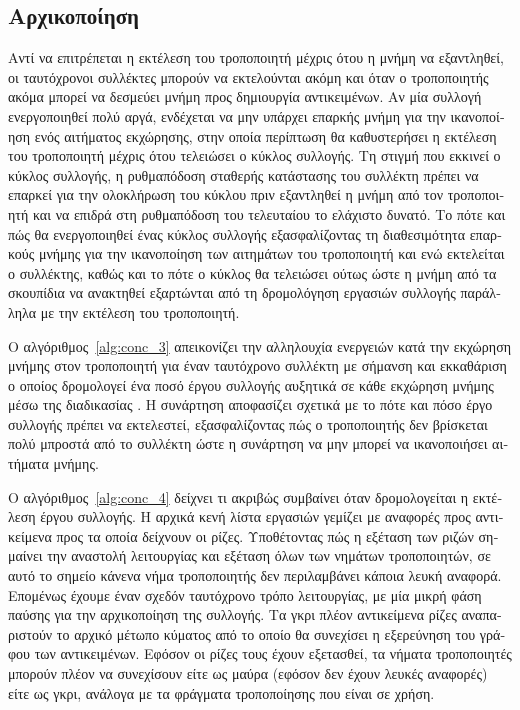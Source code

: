 \begin{greek}
\subsection{Αρχικοποίηση}
Αντί να επιτρέπεται η εκτέλεση του τροποποιητή μέχρις ότου η μνήμη να εξαντληθεί, οι ταυτόχρονοι 
συλλέκτες μπορούν να εκτελούνται ακόμη και όταν ο τροποποιητής ακόμα μπορεί να δεσμεύει μνήμη 
προς δημιουργία αντικειμένων. Αν μία συλλογή  ενεργοποιηθεί πολύ αργά, ενδέχεται να μην υπάρχει 
επαρκής μνήμη για την ικανοποίηση ενός αιτήματος εκχώρησης, στην οποία περίπτωση θα καθυστερήσει 
η εκτέλεση του τροποποιητή μέχρις ότου τελειώσει ο κύκλος συλλογής. Τη στιγμή που εκκινεί ο 
κύκλος συλλογής, η ρυθμαπόδοση σταθερής κατάστασης του συλλέκτη πρέπει να επαρκεί για την 
ολοκλήρωση του κύκλου πριν εξαντληθεί η μνήμη από τον τροποποιητή και να επιδρά στη ρυθμαπόδοση 
του τελευταίου το ελάχιστο δυνατό. Το πότε και πώς θα ενεργοποιηθεί ένας κύκλος συλλογής 
εξασφαλίζοντας τη διαθεσιμότητα επαρκούς μνήμης για την ικανοποίηση των αιτημάτων του τροποποιητή 
και ενώ εκτελείται ο συλλέκτης, καθώς και το πότε ο κύκλος θα τελειώσει ούτως ώστε η μνήμη από
τα σκουπίδια να ανακτηθεί εξαρτώνται από τη δρομολόγηση εργασιών συλλογής παράλληλα με την 
εκτέλεση του τροποποιητή.

Ο αλγόριθμος~\ref{alg:conc_3} απεικονίζει την αλληλουχία ενεργειών κατά την εκχώρηση μνήμης στον 
τροποποιητή για έναν ταυτόχρονο συλλέκτη με σήμανση και εκκαθάριση ο οποίος δρομολογεί ένα 
ποσό έργου συλλογής αυξητικά σε κάθε εκχώρηση μνήμης μέσω της διαδικασίας \textenglish{}. 
Η συνάρτηση \textenglish{} αποφασίζει σχετικά με το πότε και πόσο έργο συλλογής πρέπει να 
εκτελεστεί, εξασφαλίζοντας πώς ο τροποποιητής δεν βρίσκεται πολύ μπροστά από το συλλέκτη ώστε η 
συνάρτηση \textenglish{} να μην μπορεί να ικανοποιήσει αιτήματα μνήμης.

Ο αλγόριθμος~\ref{alg:conc_4} δείχνει τι ακριβώς συμβαίνει όταν δρομολογείται η εκτέλεση έργου 
συλλογής. Η αρχικά κενή λίστα εργασιών γεμίζει με αναφορές προς αντικείμενα προς τα οποία δείχνουν 
οι ρίζες. Υποθέτοντας πώς η εξέταση των ριζών σημαίνει την αναστολή λειτουργίας και εξέταση όλων 
των νημάτων τροποποιητών, σε αυτό το σημείο κάνενα νήμα τροποποιητής δεν περιλαμβάνει κάποια 
λευκή αναφορά. Επομένως έχουμε έναν σχεδόν ταυτόχρονο τρόπο λειτουργίας, με μία μικρή φάση παύσης 
για την αρχικοποίηση της συλλογής. Τα γκρι πλέον αντικείμενα ρίζες αναπαριστούν το αρχικό μέτωπο 
κύματος από το οποίο θα συνεχίσει η εξερεύνηση του γράφου των αντικειμένων. Εφόσον οι ρίζες τους
έχουν εξετασθεί, τα νήματα τροποποιητές μπορούν πλέον να συνεχίσουν είτε ως μαύρα (εφόσον δεν 
έχουν λευκές αναφορές) είτε ως γκρι, ανάλογα με τα φράγματα τροποποίησης που είναι σε χρήση.


\end{greek}
